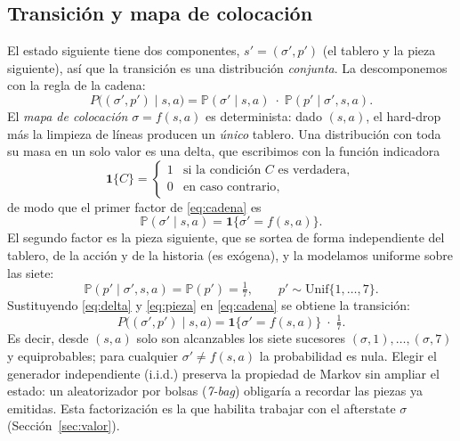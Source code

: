 \subsection{Transición y mapa de colocación}
\label{subsec:transicion}
El estado siguiente tiene dos componentes, $s' = (\sigma', p')$ (el tablero y la
pieza siguiente), así que la transición es una distribución \emph{conjunta}. La
descomponemos con la regla de la cadena:
\begin{equation}
    P\big( (\sigma', p') \mid s, a \big)
    = \mathbb{P}(\sigma' \mid s, a)\;\cdot\;\mathbb{P}(p' \mid \sigma', s, a).
    \label{eq:cadena}
\end{equation}
El \emph{mapa de colocación} $\sigma = f(s, a)$ es determinista: dado $(s, a)$, el
hard-drop más la limpieza de líneas producen un \emph{único} tablero. Una
distribución con toda su masa en un solo valor es una delta, que escribimos con la
función indicadora
\begin{equation}
    \mathbf{1}\{C\} =
    \begin{cases}
        1 & \text{si la condición } C \text{ es verdadera}, \\[2pt]
        0 & \text{en caso contrario},
    \end{cases}
\end{equation}
de modo que el primer factor de \eqref{eq:cadena} es
\begin{equation}
    \mathbb{P}(\sigma' \mid s, a) = \mathbf{1}\{\sigma' = f(s, a)\}.
    \label{eq:delta}
\end{equation}
El segundo factor es la pieza siguiente, que se sortea de forma independiente del
tablero, de la acción y de la historia (es exógena), y la modelamos uniforme sobre
las siete:
\begin{equation}
    \mathbb{P}(p' \mid \sigma', s, a) = \mathbb{P}(p') = \tfrac{1}{7},
    \qquad p' \sim \mathrm{Unif}\{1, \dots, 7\}.
    \label{eq:pieza}
\end{equation}
Sustituyendo \eqref{eq:delta} y \eqref{eq:pieza} en \eqref{eq:cadena} se obtiene la
transición:
\begin{equation}
    P\big( (\sigma', p') \mid s, a \big)
    = \mathbf{1}\{\sigma' = f(s, a)\}\;\cdot\;\tfrac{1}{7}.
    \label{eq:transicion}
\end{equation}
Es decir, desde $(s, a)$ solo son alcanzables los siete sucesores
$(\sigma, 1), \dots, (\sigma, 7)$ y equiprobables; para cualquier $\sigma' \neq f(s, a)$ la probabilidad es
nula. Elegir el generador independiente (i.i.d.) preserva la propiedad de Markov
sin ampliar el estado: un aleatorizador por bolsas (\emph{7-bag}) obligaría a
recordar las piezas ya emitidas. Esta factorización es la que habilita trabajar con el afterstate $\sigma$
(Sección~\ref{sec:valor}).

